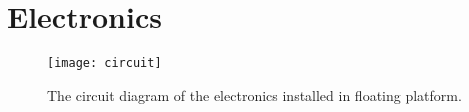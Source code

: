 \section{Electronics}

\begin{figure}[h]
   \centering
   \texttt{[image: circuit]}
   \caption{The circuit diagram of the electronics installed in floating platform.}
   \label{fig:circuit}
\end{figure}
